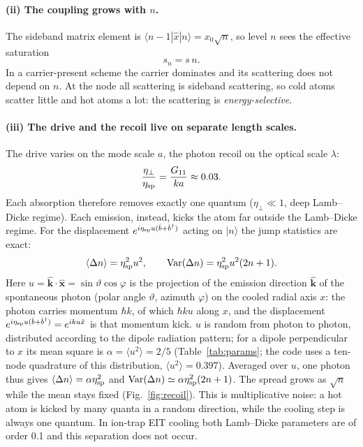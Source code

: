 \documentclass[11pt,a4paper]{article}
\newcommand{\ket}[1]{|#1\rangle}
\newcommand{\etap}{\eta_\perp}
\newcommand{\etasp}{\eta_{\rm sp}}
\begin{document}
\paragraph{(ii) The coupling grows with $n$.} The sideband matrix element is $\langle n-1|\hat x|n\rangle=x_0\sqrt n$, so level $n$ sees the effective saturation
\begin{equation}
  s_n=s\,n .
  \label{eq:sn}
\end{equation}
In a carrier-present scheme the carrier dominates and its scattering does not depend on $n$. At the node all scattering is sideband scattering, so cold atoms scatter little and hot atoms a lot: the scattering is \emph{energy-selective}.

\paragraph{(iii) The drive and the recoil live on separate length scales.} The drive varies on the mode scale $a$, the photon recoil on the optical scale $\lambda$:
\begin{equation}
  \frac{\etap}{\etasp}=\frac{G_{11}}{ka}\approx0.03 .
\end{equation}
Each absorption therefore removes exactly one quantum ($\etap\ll1$, deep Lamb--Dicke regime). Each emission, instead, kicks the atom far outside the Lamb--Dicke regime. For the displacement $e^{i\etasp u(\hat b+\hat b^\dagger)}$ acting on $\ket n$ the jump statistics are exact:
\begin{equation}
  \langle\Delta n\rangle=\etasp^2u^2,\qquad {\rm Var}(\Delta n)=\etasp^2u^2(2n+1).
  \label{eq:kick}
\end{equation}
Here $u=\hat{\mathbf k}\cdot\hat{\mathbf x}=\sin\vartheta\cos\varphi$ is the projection of the emission direction $\hat{\mathbf k}$ of the spontaneous photon (polar angle $\vartheta$, azimuth $\varphi$) on the cooled radial axis $x$: the photon carries momentum $\hbar k$, of which $\hbar k u$ along $x$, and the displacement $e^{i\etasp u(\hat b+\hat b^\dagger)}=e^{iku\hat x}$ is that momentum kick. $u$ is random from photon to photon, distributed according to the dipole radiation pattern; for a dipole perpendicular to $x$ its mean square is $\alpha=\langle u^2\rangle=2/5$ (Table~\ref{tab:params}; the code uses a ten-node quadrature of this distribution, $\langle u^2\rangle=0.397$). Averaged over $u$, one photon thus gives $\langle\Delta n\rangle=\alpha\etasp^2$ and ${\rm Var}(\Delta n)\simeq\alpha\etasp^2(2n+1)$. The spread grows as $\sqrt n$ while the mean stays fixed (Fig.~\ref{fig:recoil}). This is multiplicative noise: a hot atom is kicked by many quanta in a random direction, while the cooling step is always one quantum. In ion-trap EIT cooling both Lamb--Dicke parameters are of order 0.1 and this separation does not occur.
\end{document}
